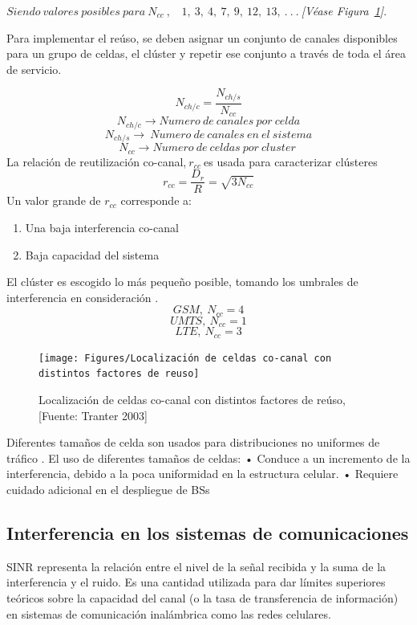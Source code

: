 $Siendo\ valores\ posibles\ para\ N_{cc}\ ,\ \ \ \ 1,\ 3,\ 4,\ 7,\ 9,\ 12,\ 13,\ .\ .\ .\ $\textit{[Véase Figura~\ref{fig:celdascocanal}]}.\newline

Para implementar el reúso, se deben asignar un conjunto de canales disponibles para un grupo de celdas, el clúster y repetir ese conjunto a través de toda el área de servicio.

\begin{equation}
N_{ch/c}=\frac{N_{ch/s}}{N_{cc}} 
\label{eqn:Nch}
\end{equation}
\[N_{ch/c}\to Numero\ de\ canales\ por\ celda\] 
\[N_{ch/s}\to \ Numero\ de\ canales\ en\ el\ sistema\] 
\[N_{cc}\to Numero\ de\ celdas\ por\ cluster\ \] 
La relación de reutilización co-canal,$\ r_{cc}\ $es usada para caracterizar clústeres\
\begin{equation}
r_{cc}=\frac{D_r}{R}=\sqrt{3N_{cc}}
\label{eqn:}
\end{equation}
Un valor grande de $r_{cc}$ corresponde a:
\begin{enumerate}
\item  Una baja interferencia co-canal
\item  Baja capacidad del sistema
\end{enumerate}
El clúster es escogido lo más pequeño posible, tomando los umbrales de interferencia en consideración \parencite{Correia2018}.
\[GSM,\ {N}_{cc}=4\] 
\[UMTS,\ {N}_{cc}=1\] 
\[LTE,\ {N}_{cc}=3\] 
\begin{figure}[th]
\centering
\texttt{[image: Figures/Localización de celdas co-canal con distintos factores de reuso]}
\decoRule
\caption[Localización de celdas co-canal con distintos factores de reúso]{Localización de celdas co-canal con distintos factores de reúso, [Fuente: Tranter 2003]}
\label{fig:celdascocanal}
\end{figure}
Diferentes tamaños de celda son usados para distribuciones no uniformes de tráfico \parencite{TurjmanSmallCells}. El uso de diferentes tamaños de celdas:\newline
•	Conduce a un incremento de la interferencia, debido a la poca uniformidad en la estructura celular.\newline
•	Requiere cuidado adicional en el despliegue de BSs


\subsection{Interferencia en los sistemas de comunicaciones}
SINR representa la relación entre el nivel de la señal recibida y la suma de la interferencia y el ruido. Es una cantidad utilizada para dar límites superiores teóricos sobre la capacidad del canal (o la tasa de transferencia de información) en sistemas de comunicación inalámbrica como las redes celulares. \newline

